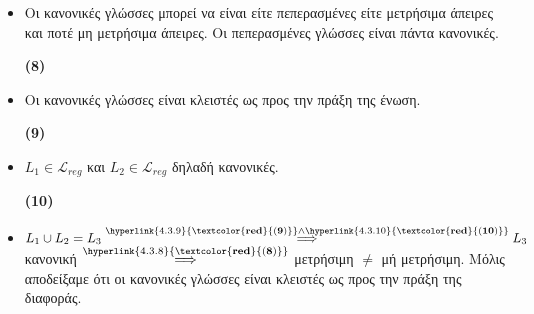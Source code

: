 \begin{tcolorbox}[colback=yellow!15!white, colframe=blue!50!white,
	fonttitle=\bfseries\Large, title = Απόδειξη με χρήση ιδιοτήτων κανονικών γλωσσών]
	\begin{itemize}
		\itemsep1em

	\item Οι κανονικές γλώσσες μπορεί να είναι είτε πεπερασμένες είτε μετρήσιμα άπειρες και ποτέ μη μετρήσιμα
	άπειρες. Οι πεπερασμένες γλώσσες είναι πάντα κανονικές.
	\reducevspace\reducevspace\reducevspace\reducevspace\reducevspace\reducevspace\reducevspace
	\reducevspace\reducevspace\reducevspace\reducevspace\reducevspace\reducevspace\reducevspace
	\begin{flushright}\hypertarget{4.3.8}{\bf{(8)}}\end{flushright}

	\item Οι κανονικές γλώσσες είναι κλειστές ως προς την πράξη της ένωση.
	\reducevspace\reducevspace\reducevspace\reducevspace\reducevspace\reducevspace\reducevspace
	\reducevspace\reducevspace\reducevspace\reducevspace\reducevspace\reducevspace\reducevspace
	\begin{flushright}\hypertarget{4.3.9}{\bf{(9)}}\end{flushright}

	\item $L_1 \in \mathcal{L}_{reg}$ και $L_2 \in \mathcal{L}_{reg}$ δηλαδή κανονικές.
	\reducevspace\reducevspace\reducevspace\reducevspace\reducevspace\reducevspace\reducevspace
	\reducevspace\reducevspace\reducevspace\reducevspace\reducevspace\reducevspace\reducevspace
	\begin{flushright}\hypertarget{4.3.10}{\bf{(10)}}\end{flushright}

	\item $L_1 \cup L_2 = L_3 \overset{\hyperlink{4.3.9}{\bf{\textcolor{red}{(9)}}}
	\land \hyperlink{4.3.10}{\bf{\textcolor{red}{(10)}}}}{\Longrightarrow} L_3$ κανονική
	$\overset{\hyperlink{4.3.8}{\bf{\textcolor{red}{(8)}}}}{\Longrightarrow}$ μετρήσιμη $\neq$ μή μετρήσιμη. Μόλις
	αποδείξαμε ότι οι κανονικές γλώσσες είναι κλειστές ως προς την πράξη της διαφοράς.
	\reducevspace\reducevspace\reducevspace\reducevspace\reducevspace\reducevspace\reducevspace
	\reducevspace\reducevspace\reducevspace\reducevspace\reducevspace\reducevspace\reducevspace
	\begin{flushright}\bf{\qedsymbol{}}\end{flushright}

\end{itemize}
\end{tcolorbox}

